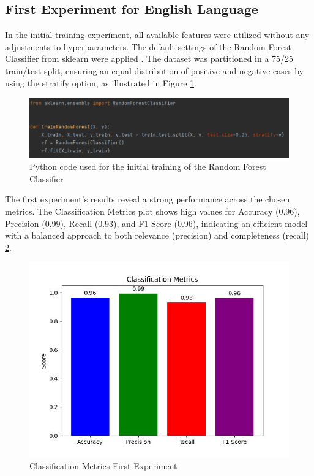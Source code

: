 \subsection{First Experiment for English Language}

\quad In the initial training experiment, all available features were utilized without any adjustments to hyperparameters. The default settings of the Random Forest Classifier from sklearn were applied \cite{sklearn_api}. The dataset was partitioned in a 75/25 train/test split, ensuring an equal distribution of positive and negative cases by using the stratify option, as illustrated in Figure \ref{codeTrainRF}.

\begin{figure}[htbp]
	\centering
		\includegraphics[scale=0.6]{LaTeX Bachelor Thesis Depression Signs Detection/figures/codeTrainingRF.png}
	\caption{Python code used for the initial training of the Random Forest Classifier}
	\label{codeTrainRF}
\end{figure}

The first experiment's results reveal a strong performance across the chosen metrics. The Classification Metrics plot shows high values for Accuracy (0.96), Precision (0.99), Recall (0.93), and F1 Score (0.96), indicating an efficient model with a balanced approach to both relevance (precision) and completeness (recall) \ref{classificationMetricsFirstExperiment}.

\begin{figure}[htbp]
	\centering
		\includegraphics[scale=0.8]{LaTeX Bachelor Thesis Depression Signs Detection/figures/metrics/experiment1English/classificationMetrics.jpg}
	\caption{Classification Metrics First Experiment}
	\label{classificationMetricsFirstExperiment}
\end{figure}

